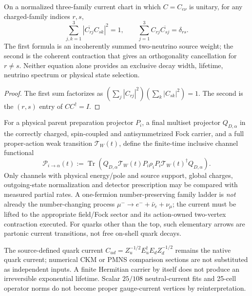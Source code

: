 \documentclass[12pt,a4paper]{article}
\begin{document}
\begin{proposition}
\label{p5c:prop:v365-family-decay-factor}
On a normalized three-family current chart in which $C=C_{e\nu}$
is unitary, for any charged-family indices $r,s$,
\[
\boxed{\sum_{j,k=1}^{3}|\overline{C_{rj}}C_{sk}|^2=1,
\qquad\sum_{j=1}^{3}C_{rj}\overline{C_{sj}}=\delta_{rs}.}
\]
The first formula is an incoherently summed two-neutrino source
weight; the second is the coherent contraction that gives an
orthogonality cancellation for $r\ne s$.  Neither equation alone
provides an exclusive decay width, lifetime, neutrino spectrum or
physical state selection.
\end{proposition}
\begin{proof}
The first sum factorizes as
$(\sum_j|C_{rj}|^2)(\sum_k|C_{sk}|^2)=1$.  The second is
the $(r,s)$ entry of $CC^\dagger=I$.
\end{proof}

\begin{definition}
\label{p5c:def:v365-decay-source-contract}
For a physical parent preparation projector $P_i$, a final
multiset projector $Q_{D,\alpha}$ in the correctly charged,
spin-coupled and antisymmetrized Fock carrier, and a full
proper-action weak transition $\mathcal T_W(t)$, define the
finite-time inclusive channel functional
\[
\mathcal P_{i\to\alpha}(t)
 :=\operatorname{Tr}\!\left(
 Q_{D,\alpha}\mathcal T_W(t)P_i\rho_iP_i
 \mathcal T_W(t)^\dagger Q_{D,\alpha}\right).
\]
Only channels with physical energy/pole and source support, global
charges, outgoing-state normalization and detector prescription
may be compared with measured partial rates.  A one-fermion
number-preserving family ladder is \emph{not} already the
number-changing process $\mu^-\to e^-+\bar\nu_e+\nu_\mu$;
the current must be lifted to the appropriate field/Fock
sector and its action-owned two-vertex contraction executed.
For quarks other than the top, such elementary arrows are
partonic current transitions, not free on-shell quark decays.
\end{definition}

\begin{remark}
\label{p5c:rem:v365-channel-physical-firewall}
\leavevmode\par\noindent
The source-defined quark current
\(C_{ud}=Z_u^{-1/2}E_u^\dagger E_dZ_d^{-1/2}\)
remains the native quark current; numerical CKM or PMNS comparison
sections are not substituted as independent inputs.  A finite
Hermitian carrier by itself does not produce an irreversible
exponential lifetime.  Scalar $25/108$ neutral-current fits and
25-cell operator norms do not become proper gauge-current vertices
by reinterpretation.
\end{remark}
\end{document}
